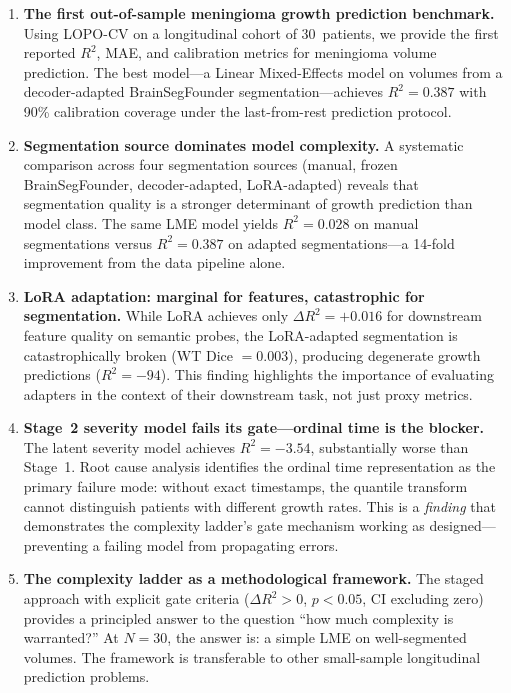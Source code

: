 \begin{enumerate}[leftmargin=*]
  \item \textbf{The first out-of-sample meningioma growth prediction
    benchmark.} Using LOPO-CV on a longitudinal cohort of 30~patients,
    we provide the first reported $R^2$, MAE, and calibration metrics for
    meningioma volume prediction. The best model---a Linear Mixed-Effects
    model on volumes from a decoder-adapted BrainSegFounder
    segmentation---achieves $R^2 = 0.387$ with 90\% calibration coverage
    under the last-from-rest prediction protocol.

  \item \textbf{Segmentation source dominates model complexity.}
    A systematic comparison across four segmentation sources (manual,
    frozen BrainSegFounder, decoder-adapted, LoRA-adapted) reveals that
    segmentation quality is a stronger determinant of growth prediction
    than model class. The same LME model yields $R^2 = 0.028$ on manual
    segmentations versus $R^2 = 0.387$ on adapted segmentations---a
    14-fold improvement from the data pipeline alone.

  \item \textbf{LoRA adaptation: marginal for features, catastrophic for
    segmentation.} While LoRA achieves only $\Delta R^2 = +0.016$ for
    downstream feature quality on semantic probes, the LoRA-adapted
    segmentation is catastrophically broken (WT Dice $= 0.003$),
    producing degenerate growth predictions ($R^2 = -94$). This finding
    highlights the importance of evaluating adapters in the context of
    their downstream task, not just proxy metrics.

  \item \textbf{Stage~2 severity model fails its gate---ordinal time is
    the blocker.} The latent severity model achieves $R^2 = -3.54$,
    substantially worse than Stage~1. Root cause analysis identifies the
    ordinal time representation as the primary failure mode: without exact
    timestamps, the quantile transform cannot distinguish patients with
    different growth rates. This is a \emph{finding} that demonstrates
    the complexity ladder's gate mechanism working as designed---preventing
    a failing model from propagating errors.

  \item \textbf{The complexity ladder as a methodological framework.}
    The staged approach with explicit gate criteria ($\Delta R^2 > 0$,
    $p < 0.05$, CI excluding zero) provides a principled answer to the
    question ``how much complexity is warranted?'' At $N = 30$, the answer
    is: a simple LME on well-segmented volumes. The framework is
    transferable to other small-sample longitudinal prediction problems.
\end{enumerate}

